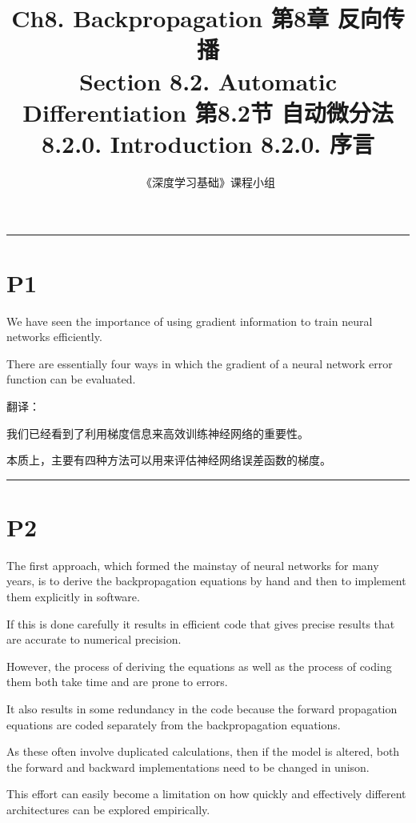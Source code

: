 \documentclass{article}
\title{Ch8. Backpropagation \hfill 第8章 反向传播 \\ 
Section 8.2. Automatic Differentiation \hfill 第8.2节 自动微分法 \\ 
8.2.0. Introduction \hfill 8.2.0. 序言}
\author{《深度学习基础》课程小组}
\begin{document}
\maketitle

\setlength{\parindent}{0pt} %
\setlength{\parskip}{1.5em} %

\noindent\rule{\linewidth}{0.4pt}

\section{P1}

We have seen the importance of using gradient information to train neural networks efficiently. 

There are essentially four ways in which the gradient of a neural network error function can be evaluated.

{\color{red}
翻译：

我们已经看到了利用梯度信息来高效训练神经网络的重要性。

本质上，主要有四种方法可以用来评估神经网络误差函数的梯度。

}

\noindent\rule{\linewidth}{0.4pt}

\section{P2}

The first approach, which formed the mainstay of neural networks for many years, is to derive the backpropagation equations by hand and then to implement them explicitly in software. 

If this is done carefully it results in efficient code that gives precise results that are accurate to numerical precision. 

However, the process of deriving the equations as well as the process of coding them both take time and are prone to errors. 

It also results in some redundancy in the code because the forward propagation equations are coded separately from the backpropagation equations. 

As these often involve duplicated calculations, then if the model is altered, both the forward and backward implementations need to be changed in unison. 

This effort can easily become a limitation on how quickly and effectively different architectures can be explored empirically.
\end{document}

